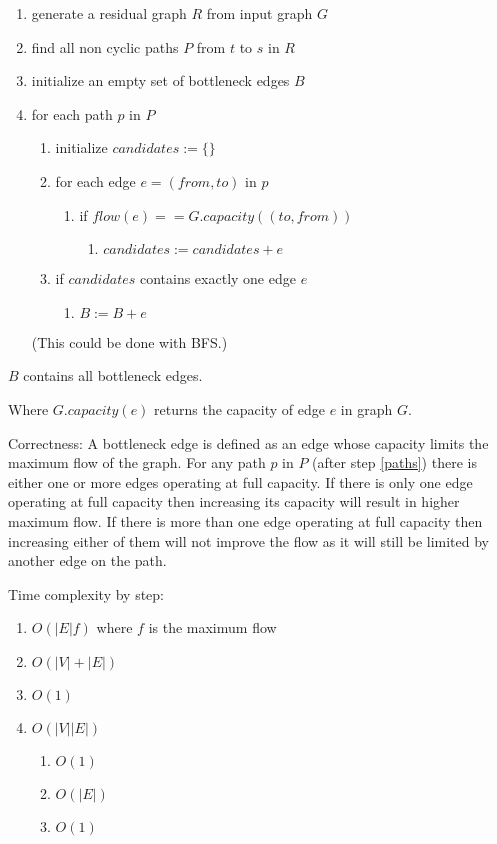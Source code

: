 \documentclass[12pt]{article}
\begin{document}
\begin{enumerate}
	\item generate a residual graph $R$ from input graph $G$
	\item find all non cyclic paths $P$ from $t$ to $s$ in $R$ \label{paths}
	\item initialize an empty set of bottleneck edges $B$
	\item for each path $p$ in $P$
		\begin{enumerate}
			\item initialize $candidates := \{\}$
			\item for each edge $e = (from, to)$ in $p$
			\begin{enumerate}
				\item if $flow(e) == G.capacity((to, from))$
				\begin{enumerate}
					\item $candidates := candidates + e$
				\end{enumerate}
			\end{enumerate}
			\item if $candidates$ contains exactly one edge $e$
			\begin{enumerate}
				\item $B := B + e$
			\end{enumerate}
		\end{enumerate}

	(This could be done with BFS.)
\end{enumerate}

$B$ contains all bottleneck edges.

Where $G.capacity(e)$ returns the capacity of edge $e$ in graph $G$.

Correctness: A bottleneck edge is defined as an edge whose capacity limits the maximum flow of the graph. For any path $p$ in $P$ (after step \ref{paths}) there is either one or more edges operating at full capacity. If there is only one edge operating at full capacity then increasing its capacity will result in higher maximum flow. If there is more than one edge operating at full capacity then increasing either of them will not improve the flow as it will still be limited by another edge on the path.

Time complexity by step:
\begin{enumerate}
	\item $O(|E|f)$ where $f$ is the maximum flow
	\item $O(|V| + |E|)$
	\item $O(1)$
	\item $O(|V||E|)$
	\begin{enumerate}
		\item $O(1)$
		\item $O(|E|)$
		\item $O(1)$
	\end{enumerate}
\end{enumerate}

\section{} %
\section{} %
\end{document}
